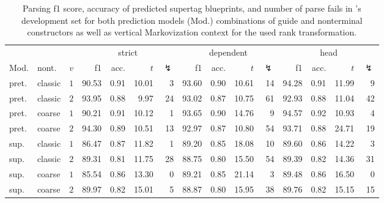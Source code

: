 \documentclass[../../document.tex]{subfiles}
\begin{document}
    \begin{table}
        \caption{\label{tbl:experiments:dptb}
        Parsing f1 score, accuracy of predicted supertag blueprints, and number of parse fails in 's development set for both prediction models (Mod.) combinations of guide and nonterminal constructors as well as vertical Markovization context for the used rank transformation.
        }
        \centering
        \setlength{\tabcolsep}{4pt}
        \vspace{.2cm}
        \begin{tabular}{llc|rrrr|rrrr|rrrr}
            \toprule
  &             &        & \multicolumn{4}{c|}{strict} & \multicolumn{4}{c|}{dependent} & \multicolumn{4}{c}{head}  \\
Mod. &     nont.   &\(v\)   & f1 & acc. & $t$ & $\lightning$ & f1 & acc. & $t$ & $\lightning$ & f1 & acc. & $t$ & $\lightning$ \\ \hline
pret. &     classic & \(1\)  & 90.53 & 0.91 & 10.01 & 3 & 93.60 & 0.90 & 10.61 & 14 & 94.28 & 0.91 & 11.99 & 9 \\
pret. &     classic & \(2\)  & 93.95 & 0.88 & 9.97 & 24 & 93.02 & 0.87 & 10.75 & 61 & 92.93 & 0.88 & 11.04 & 42 \\
pret. &     coarse  & \(1\)  & 90.21 & 0.91 & 10.12 & 1 & 93.65 & 0.90 & 14.76 & 9 & 94.57 & 0.92 & 10.93 & 4 \\
pret. &     coarse  & \(2\)  & 94.30 & 0.89 & 10.51 & 13 & 92.97 & 0.87 & 10.80 & 54 & 93.71 & 0.88 & 24.71 & 19 \\
\midrule
sup. & classic & \(1\)  & 86.47 & 0.87 & 11.82 & 1 & 89.20 & 0.85 & 18.08 & 10 & 89.60 & 0.86 & 14.22 & 3 \\
sup. & classic & \(2\)  & 89.31 & 0.81 & 11.75 & 28 & 88.75 & 0.80 & 15.50 & 54 & 89.39 & 0.82 & 14.36 & 31 \\
sup. & coarse  & \(1\)  & 85.54 & 0.86 & 13.30 & 0 & 89.21 & 0.85 & 21.14 & 3 & 89.48 & 0.86 & 16.50 & 0 \\
sup. & coarse  & \(2\)  & 89.97 & 0.82 & 15.01 & 5 & 88.87 & 0.80 & 15.95 & 38 & 89.76 & 0.82 & 15.15 & 15 \\
    \bottomrule
        \end{tabular}
    \end{table}
\end{document}

